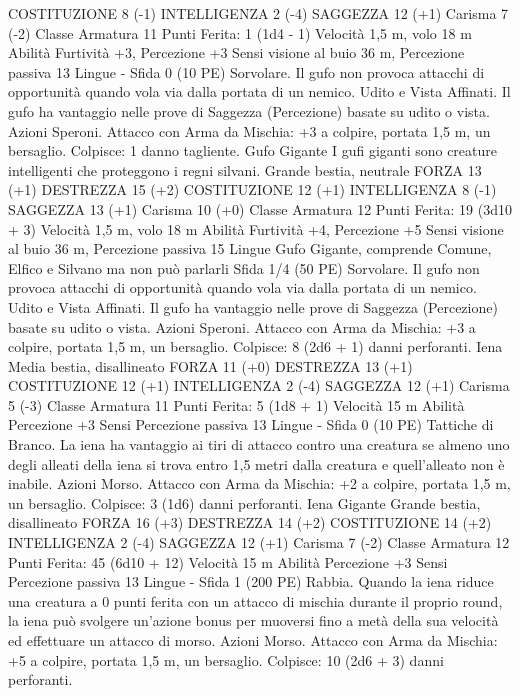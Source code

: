 \begin{multicols}{2}
COSTITUZIONE 8 (-1)
INTELLIGENZA 2 (-4)
SAGGEZZA 12 (+1)
Carisma 7 (-2)
Classe Armatura 11
\hspace*{0pt}\hfill{Punti Ferita}: 1 (1d4 - 1)
Velocità 1,5 m, volo 18 m
Abilità Furtività +3, Percezione +3
Sensi visione al buio 36 m, Percezione passiva 13
Lingue -
Sfida 0 (10 PE)
Sorvolare. Il gufo non provoca attacchi di opportunità quando
vola via dalla portata di un nemico.
Udito e Vista Affinati. Il gufo ha vantaggio nelle prove di
Saggezza (Percezione) basate su udito o vista.
Azioni
Speroni. Attacco con Arma da Mischia: +3 a colpire, portata 1,5
m, un bersaglio.
Colpisce: 1 danno tagliente.
Gufo Gigante
I gufi giganti sono creature intelligenti che proteggono i
regni silvani.
Grande bestia, neutrale
FORZA 13 (+1)
DESTREZZA 15 (+2)
COSTITUZIONE 12 (+1)
INTELLIGENZA 8 (-1)
SAGGEZZA 13 (+1)
Carisma 10 (+0)
Classe Armatura 12
\hspace*{0pt}\hfill{Punti Ferita}: 19 (3d10 + 3)
Velocità 1,5 m, volo 18 m
Abilità Furtività +4, Percezione +5
Sensi visione al buio 36 m, Percezione passiva 15
Lingue Gufo Gigante, comprende Comune, Elfico e Silvano ma
non può parlarli
Sfida 1/4 (50 PE)
Sorvolare. Il gufo non provoca attacchi di opportunità quando
vola via dalla portata di un nemico.
Udito e Vista Affinati. Il gufo ha vantaggio nelle prove di
Saggezza (Percezione) basate su udito o vista.
Azioni
Speroni. Attacco con Arma da Mischia: +3 a colpire, portata 1,5
m, un bersaglio.
Colpisce: 8 (2d6 + 1) danni perforanti.
Iena
Media bestia, disallineato
FORZA 11 (+0)
DESTREZZA 13 (+1)
COSTITUZIONE 12 (+1)
INTELLIGENZA 2 (-4)
SAGGEZZA 12 (+1)
Carisma 5 (-3)
Classe Armatura 11
\hspace*{0pt}\hfill{Punti Ferita}: 5 (1d8 + 1)
Velocità 15 m
Abilità Percezione +3
Sensi Percezione passiva 13
Lingue -
Sfida 0 (10 PE)
Tattiche di Branco. La iena ha vantaggio ai tiri di attacco contro
una creatura se almeno uno degli alleati della iena si trova entro
1,5 metri dalla creatura e quell’alleato non è inabile.
Azioni
Morso. Attacco con Arma da Mischia: +2 a colpire, portata 1,5
m, un bersaglio.
Colpisce: 3 (1d6) danni perforanti.
Iena Gigante
Grande bestia, disallineato
FORZA 16 (+3)
DESTREZZA 14 (+2)
COSTITUZIONE 14 (+2)
INTELLIGENZA 2 (-4)
SAGGEZZA 12 (+1)
Carisma 7 (-2)
Classe Armatura 12
\hspace*{0pt}\hfill{Punti Ferita}: 45 (6d10 + 12)
Velocità 15 m
Abilità Percezione +3
Sensi Percezione passiva 13
Lingue -
Sfida 1 (200 PE)
Rabbia. Quando la iena riduce una creatura a 0 punti ferita con
un attacco di mischia durante il proprio round, la iena può
svolgere un’azione bonus per muoversi fino a metà della sua
velocità ed effettuare un attacco di morso.
Azioni
Morso. Attacco con Arma da Mischia: +5 a colpire, portata 1,5
m, un bersaglio.
Colpisce: 10 (2d6 + 3) danni perforanti.
 

\end{multicols}
